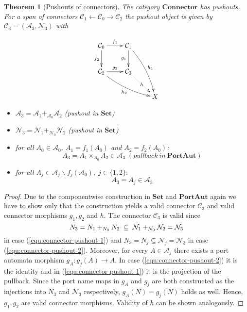 \documentclass[copyright,creativecommons]{eptcs}
\newtheorem{theorem}{Theorem}
\newcommand{\Set}{\ensuremath{\mathbf{Set}}}
\newcommand{\PA}{\ensuremath{\mathbf{PortAut}}}
\newcommand{\Connector}{\ensuremath{\mathbf{Connector}}}
\newcommand{\N}{\ensuremath{\mathcal{N}}}
\newcommand{\A}{\ensuremath{\mathcal{A}}}
\newcommand{\C}{\ensuremath{\mathcal{C}}}
\begin{document}
\begin{theorem}[Pushouts of connectors]
\label{thm:connector-pushouts}
The category {\Connector} has pushouts. 
For a span of connectors $\C_1 \leftarrow
\C_0 \to \C_2$ the pushout object is given by $\C_3 = (\A_3,\N_3)$ with\\
\begin{minipage}{0.25\textwidth}
\[\xymatrix{
  \C_0 \ar[r]^{f_1} \ar[d]_{f_2} &	
  \C_1 \ar[d]_{g_1} \ar@/^/[ddr]^{h_1} \\
  \C_2 \ar[r]^{g_2} \ar@/_/[drr]_{h_2} & 
  \C_3 \ar@{.>}[dr]|-{h} \\ & & X 
  }\]
\vspace{3mm}
\end{minipage}
\hfill
\begin{minipage}{0.7\textwidth}
\vspace{3mm}
\begin{itemize}
\item $\A_3 = \A_1 +_{\A_0} \A_2$ (pushout in \Set)
\item $\N_3 = \N_1 +_{\N_0} \N_2$ (pushout in \Set)
\vspace{3mm}
\item for all $A_0 \in \A_0$, $A_1=f_1(A_0)$ and $A_2=f_2(A_0)$:
\begin{equation}
\label{equ:connector-pushout-1}
A_3 = A_1 \times_{A_0} A_2 \in \A_3\;(pullback~in~\PA)
\end{equation}
\item for all $A_j \in \A_j \backslash f_j(\A_0), \; j\in \{1,2\}:$
\begin{equation}
\label{equ:connector-pushout-2}
 A_3 = A_j \in \A_3
\end{equation}
\end{itemize}
\end{minipage}
\end{theorem}
\begin{proof}
Due to the componentwise construction in {\Set} and {\PA} again
we have to show only that the construction yields a valid connector $\C_3$
and valid connector morphisms $g_1,g_2$ and $h$. The connector $\C_3$ is valid
since 
\[
N_3 = N_1 +_{N_0} N_2 \; \subseteq \; \N_1 +_{\N_0} \N_2 = \N_3
\vspace{0.2cm}
\]
in case (\ref{equ:connector-pushout-1}) and $N_3 = N_j \subseteq \N_j =
\N_3$ in case (\ref{equ:connector-pushout-2}).
Moreover, for every $A \in \A_j$ there exists a port automata morphism
$g_A: g_j(A) \to A$. In case (\ref{equ:connector-pushout-2}) it is the identity
and in (\ref{equ:connector-pushout-1}) it is the projection of the pullback.
Since the port name maps in $g_A$ and $g_j$ are both constructed as the injections
into $N_3$ and $\N_3$ respectively, $g_A(N) = g_{j}(N)$ holds as well.
Hence, $g_1,g_2$ are valid connector morphisms. Validity of $h$
can be shown analogously.
\end{proof}
\end{document}
